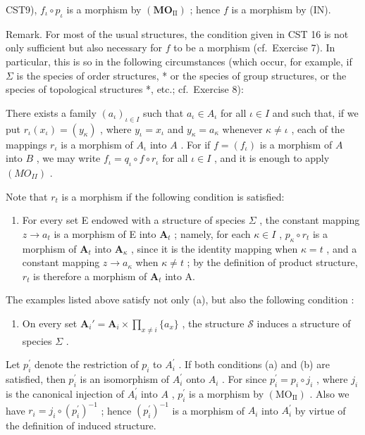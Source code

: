 CST9), \(f_{\iota} \circ p_{\iota}\) is a morphism by \((\mathbf{MO}_{\mathrm{II}})\) ; hence \(f\) is a morphism by (IN).

Remark. For most of the usual structures, the condition given in CST 16 is not only sufficient but also necessary for \(f\) to be a morphism (cf.~Exercise 7). In particular, this is so in the following circumstances (which occur, for example, if \(\Sigma\) is the species of order structures, * or the species of group structures, or the species of topological structures *, etc.; cf.~Exercise 8):

There exists a family \((a_{\iota})_{\iota\in I}\) such that \(a_{\iota}\in A_{\iota}\) for all \(\iota \in I\) and such that, if we put \(r_\iota(x_\iota) = (y_\kappa)\) , where \(y_{\iota} = x_{\iota}\) and \(y_{\kappa} = a_{\kappa}\) whenever \(\kappa\neq \iota\) , each of the mappings \(r_\iota\) is a morphism of \(A_{\iota}\) into \(A\) . For if \(f = (f_\iota)\) is a morphism of \(A\) into \(B\) , we may write \(f_{\iota} = q_{\iota}\circ f\circ r_{\iota}\) for all \(\iota \in I\) , and it is enough to apply \((MO_{II})\) .

Note that \(r_t\) is a morphism if the following condition is satisfied:

\begin{enumerate}
\def\labelenumi{(\alph{enumi})}
\tightlist
\item
  For every set E endowed with a structure of species \(\Sigma\) , the constant mapping \(z \to a_{t}\) is a morphism of E into \(\mathbf{A}_{t}\) ; namely, for each \(\kappa \in I\) , \(p_{\kappa} \circ r_{t}\) is a morphism of \(\mathbf{A}_{t}\) into \(\mathbf{A}_{\kappa}\) , since it is the identity mapping when \(\kappa = t\) , and a constant mapping \(z \to a_{\kappa}\) when \(\kappa \neq t\) ; by the definition of product structure, \(r_{t}\) is therefore a morphism of \(\mathbf{A}_{t}\) into A.
\end{enumerate}

The examples listed above satisfy not only (a), but also the following condition :

\begin{enumerate}
\def\labelenumi{(\alph{enumi})}
\setcounter{enumi}{1}
\tightlist
\item
  On every set \(\mathbf{A}_i' = \mathbf{A}_i \times \prod_{x \neq i} \{a_x\}\) , the structure \(\mathcal{S}\) induces a structure of species \(\Sigma\) .
\end{enumerate}

Let \(p_{i}^{\prime}\) denote the restriction of \(p_{i}\) to \(A_{i}^{\prime}\) . If both conditions (a) and (b) are satisfied, then \(p_{i}^{\prime}\) is an isomorphism of \(A_{i}^{\prime}\) onto \(A_{i}\) . For since \(p_{i}^{\prime} = p_{i} \circ j_{i}\) , where \(j_{i}\) is the canonical injection of \(A_{i}^{\prime}\) into \(A\) , \(p_{i}^{\prime}\) is a morphism by \((\mathrm{MO}_{\mathrm{II}})\) . Also we have \(r_{i} = j_{i} \circ (p_{i}^{\prime})^{-1}\) ; hence \((p_{i}^{\prime})^{-1}\) is a morphism of \(A_{i}\) into \(A_{i}^{\prime}\) by virtue of the definition of induced structure.

